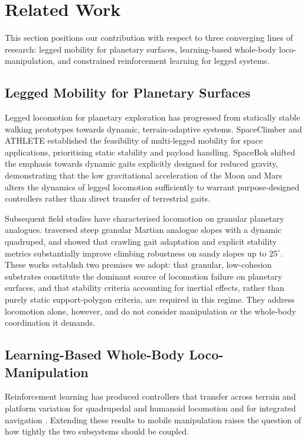 \section{Related Work}
\label{sec:related}

This section positions our contribution with respect to three converging lines of research: legged mobility for planetary surfaces, learning-based whole-body loco-manipulation, and constrained reinforcement learning for legged systems.

\subsection{Legged Mobility for Planetary Surfaces}

Legged locomotion for planetary exploration has progressed from statically stable walking prototypes towards dynamic, terrain-adaptive systems. SpaceClimber \citep{5756948} and ATHLETE \citep{Wilcox2007} established the feasibility of multi-legged mobility for space applications, prioritising static stability and payload handling. SpaceBok \citep{8794136} shifted the emphasis towards dynamic gaits explicitly designed for reduced gravity, demonstrating that the low gravitational acceleration of the Moon and Mars alters the dynamics of legged locomotion sufficiently to warrant purpose-designed controllers rather than direct transfer of terrestrial gaits.

Subsequent field studies have characterised locomotion on granular planetary analogues. \citet{Kolvenbach2022} traversed steep granular Martian analogue slopes with a dynamic quadruped, and \citet{Valsecchi2023} showed that crawling gait adaptation and explicit stability metrics substantially improve climbing robustness on sandy slopes up to $25^\circ$. These works establish two premises we adopt: that granular, low-cohesion substrates constitute the dominant source of locomotion failure on planetary surfaces, and that stability criteria accounting for inertial effects, rather than purely static support-polygon criteria, are required in this regime. They address locomotion alone, however, and do not consider manipulation or the whole-body coordination it demands.

\subsection{Learning-Based Whole-Body Loco-Manipulation}

Reinforcement learning has produced controllers that transfer across terrain and platform variation for quadrupedal and humanoid locomotion \citep{HoellerAnymalParkour, MikiWildAnymal, RLHumanoid} and for integrated navigation \citep{rudin2022advancedskillslearninglocomotion, shah2022viking}. Extending these results to mobile manipulation raises the question of how tightly the two subsystems should be coupled.

